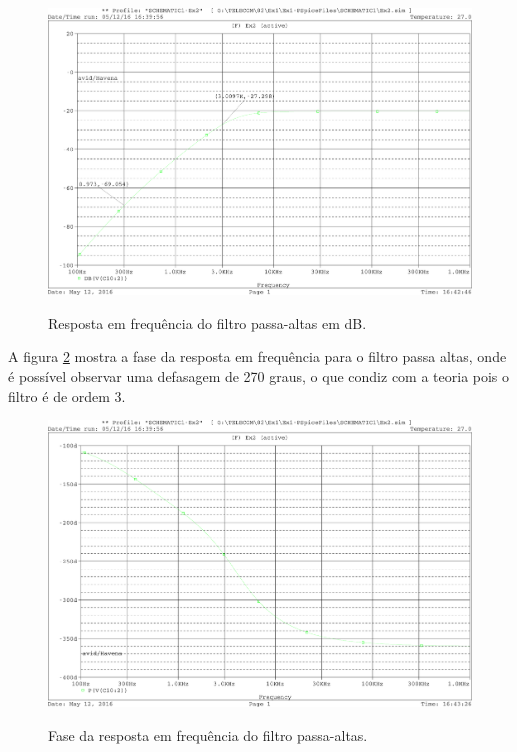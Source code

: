\begin{figure}[!h]
  \centering
  
  \includegraphics[scale=0.3]{Imagens/resp_freq_db_2}
  \label{fig:resp_freq_db_2}
  \caption{Resposta em frequência do filtro passa-altas em dB.}
\end{figure}

A figura \ref{fig:resp_freq_phase_2} mostra a fase da resposta em frequência 
para o filtro passa altas, onde é possível observar uma defasagem de 270 graus, 
o que condiz com a teoria pois o filtro é de ordem 3.

\begin{figure}[!h]
  \centering
  
  \includegraphics[scale=0.3]{Imagens/resp_freq_phase_2}
  \label{fig:resp_freq_phase_2}
  \caption{Fase da resposta em frequência do filtro passa-altas.}
\end{figure}

